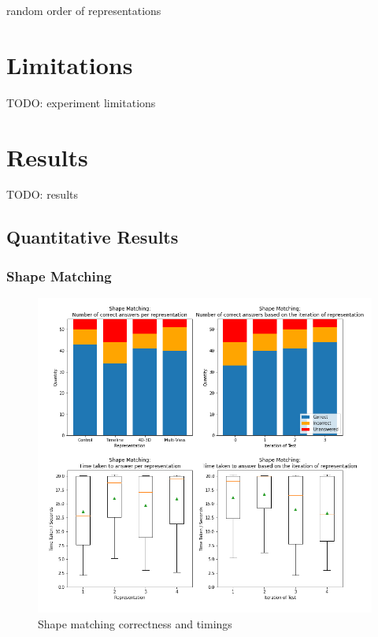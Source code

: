 \documentclass{l4proj}
\begin{document}
random order of representations

\section{Limitations}

TODO: experiment limitations

\section{Results}

TODO: results

\subsection{Quantitative Results}

\subsubsection{Shape Matching}

\begin{figure}[H]
  \includegraphics[width=\textwidth]{images/results/shape_matching_stats.png}
  \caption{Shape matching correctness and timings}
  \label{fig:shape_stats}
\end{figure}
\end{document}
